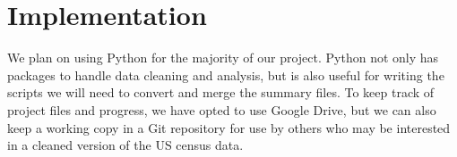 \documentclass[12pt]{article}
\begin{document}
\section*{Implementation}
We plan on using Python for the majority of our project. Python not only has packages to handle data cleaning and analysis, but is also useful for writing the scripts we will need to convert and merge the summary files. To keep track of project files and progress, we have opted to use Google Drive, but we can also keep a working copy in a Git repository for use by others who may be interested in a cleaned version of the US census data. 
\end{document}
